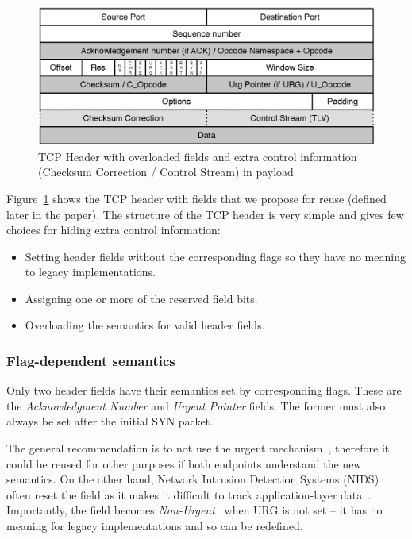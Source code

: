 \documentclass{sig-alternate-10pt}
\begin{document}
\begin{figure}[t!]
\centering
\small{
\includegraphics[width=\columnwidth]{figs/tcp-header}
\caption{TCP Header with overloaded fields and extra control information (Checksum Correction / Control Stream) in payload}
\label{fig:header}
}
\end{figure}

Figure~\ref{fig:header} shows the TCP header with fields that we propose for reuse (defined later in the paper). The structure of the TCP header is very simple and gives few choices for hiding extra control information:
\begin{itemize}
    \item Setting header fields without the corresponding flags so they have no meaning to legacy implementations.
    \item Assigning one or more of the reserved field bits.
    \item Overloading the semantics for valid header fields.
\end{itemize}

\subsubsection*{Flag-dependent semantics}
\label{sec:unset}

Only two header fields have their semantics set by corresponding flags. These are the \emph{Acknowledgment Number} and \emph{Urgent Pointer} fields. The former must also always be set after the initial SYN packet.

The general recommendation is to not use the urgent mechanism~\cite{Gont:2011vi}, therefore it could be reused for other purposes if both endpoints understand the new semantics. On the other hand, Network Intrusion Detection Systems (NIDS) often reset the field as it makes it difficult to track application-layer data~\cite{seolma}. Importantly, the field becomes \emph{Non-Urgent}~\cite{Kuhlewind:2014vd} when URG is not set -- it has no meaning for legacy implementations and so can be redefined.
\end{document}
